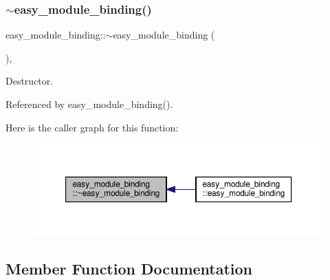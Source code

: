 \subsubsection{\texorpdfstring{$\sim$easy\+\_\+module\+\_\+binding()}{~easy\_module\_binding()}}
{\footnotesize\ttfamily easy\+\_\+module\+\_\+binding\+::$\sim$easy\+\_\+module\+\_\+binding (\begin{DoxyParamCaption}{ }\end{DoxyParamCaption})\hspace{0.3cm}{\ttfamily [override]}, {\ttfamily [default]}}



Destructor. 



Referenced by easy\+\_\+module\+\_\+binding().

Here is the caller graph for this function\+:
\nopagebreak
\begin{figure}[H]
\begin{center}
\leavevmode
\includegraphics[width=350pt]{d6/d61/classeasy__module__binding_ac6a6c816be4fbcde190f813b8e6c5172_icgraph}
\end{center}
\end{figure}


\subsection{Member Function Documentation}
\mbox{\label{classeasy__module__binding_a627ae750079d8db60409f696cb1310c9}} 
